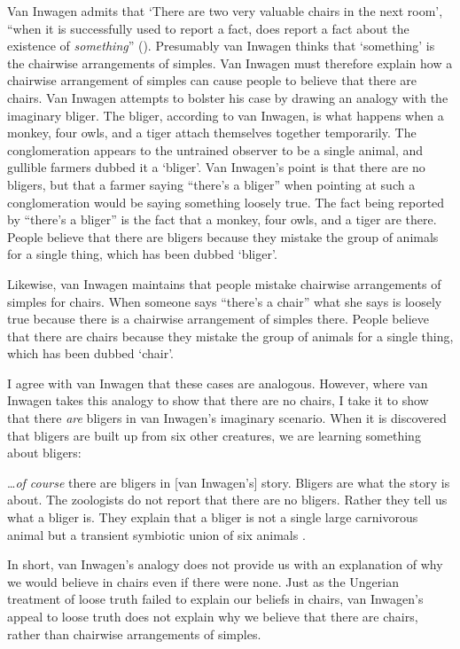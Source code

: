 \documentclass[11pt]{standalone}
\newenvironment{squote}{%
\begin{spacing}{1}
       	\begin{list}{}{%
\setlength{\labelwidth}{0pt}%
\rightmargin\leftmargin%
}
\item\relax
}{%
\end{list}%
\end{spacing}
}
\begin{document}
\begin{spacing}{1.5}
Van Inwagen admits that `There are two very valuable chairs in the
next room', ``when it is successfully used to report a fact, does
report a fact about the existence of {\em something}''
(\citeyear[102]{inwagen1995}).  Presumably van Inwagen thinks that
`something' is the chairwise arrangements of simples.  Van Inwagen
must therefore explain how a chairwise arrangement of simples can
cause people to believe that there are chairs.  Van Inwagen attempts
to bolster his case by drawing an analogy with the imaginary bliger.
The bliger, according to van Inwagen, is what happens when a monkey,
four owls, and a tiger attach themselves together temporarily.  The
conglomeration appears to the untrained observer to be a single
animal, and gullible farmers dubbed it a `bliger'.  Van Inwagen's
point is that there are no bligers, but that a farmer saying ``there's
a bliger'' when pointing at such a conglomeration would be saying
something loosely true.  The fact being reported by ``there's a
bliger'' is the fact that a monkey, four owls, and a tiger are there.
People believe that there are bligers because they mistake the group
of animals for a single thing, which has been dubbed `bliger'.

Likewise, van Inwagen maintains that people mistake chairwise
arrangements of simples for chairs.  When someone says ``there's a
chair'' what she says is loosely true because there is a chairwise
arrangement of simples there.  People believe that there are chairs
because they mistake the group of animals for a single thing, which
has been dubbed `chair'.

I agree with van Inwagen that these cases are analogous.  However,
where van Inwagen takes this analogy to show that there are no chairs,
I take it to show that there {\em are} bligers in van Inwagen's
imaginary scenario.  When it is discovered that bligers are built up
from six other creatures, we are learning something about bligers:

\begin{squote}
\ldots {\em of course} there are bligers in [van Inwagen's] story.
Bligers are what the story is about.  The zoologists do not report
that there are no bligers.  Rather they tell us what a bliger is.
They explain that a bliger is not a single large carnivorous animal
but a transient symbiotic union of six animals
\citep[704]{rosenberg1993}.
\end{squote}

In short, van Inwagen's analogy does not provide us with an
explanation of why we would believe in chairs even if there were none.
Just as the Ungerian treatment of loose truth failed to explain our
beliefs in chairs, van Inwagen's appeal to loose truth does not
explain why we believe that there are chairs, rather than chairwise
arrangements of simples.

\ifstandalone
\end{spacing}
\fi
\end{document}

